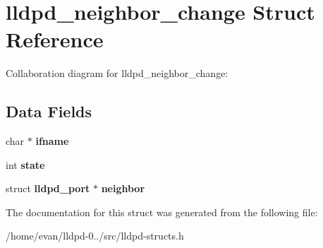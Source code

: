 \section{lldpd\-\_\-neighbor\-\_\-change \-Struct \-Reference}
\label{structlldpd__neighbor__change}


\-Collaboration diagram for lldpd\-\_\-neighbor\-\_\-change\-:
\subsection*{\-Data \-Fields}
\begin{DoxyCompactItemize}
\item 
char $\ast$ {\bfseries ifname}\label{structlldpd__neighbor__change_a57634e15933b3c82405e0bbe1e270d1b}

\item 
int {\bfseries state}\label{structlldpd__neighbor__change_a89f234133d3efe315836311cbf21c64b}

\item 
struct {\bf lldpd\-\_\-port} $\ast$ {\bfseries neighbor}\label{structlldpd__neighbor__change_a5532762fcff9d78469dc8eb895200435}

\end{DoxyCompactItemize}


\-The documentation for this struct was generated from the following file\-:\begin{DoxyCompactItemize}
\item 
/home/evan/lldpd-\/0../src/lldpd-\/structs.\-h\end{DoxyCompactItemize}

